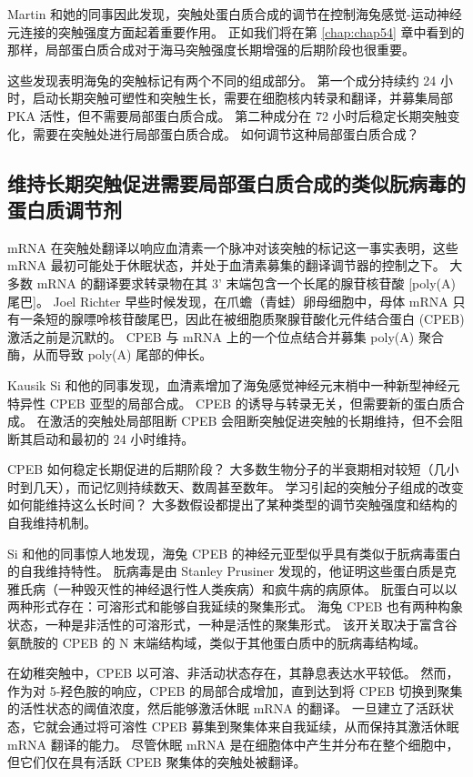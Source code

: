 Martin 和她的同事因此发现，突触处蛋白质合成的调节在控制海兔感觉-运动神经元连接的突触强度方面起着重要作用。
正如我们将在第 \ref{chap:chap54} 章中看到的那样，局部蛋白质合成对于海马突触强度长期增强的后期阶段也很重要。


这些发现表明海兔的突触标记有两个不同的组成部分。
第一个成分持续约 24 小时，启动长期突触可塑性和突触生长，需要在细胞核内转录和翻译，并募集局部 PKA 活性，但不需要局部蛋白质合成。
第二种成分在 72 小时后稳定长期突触变化，需要在突触处进行局部蛋白质合成。
如何调节这种局部蛋白质合成？



\subsection{维持长期突触促进需要局部蛋白质合成的类似朊病毒的蛋白质调节剂}

mRNA 在突触处翻译以响应血清素一个脉冲对该突触的标记这一事实表明，这些 mRNA 最初可能处于休眠状态，并处于血清素募集的翻译调节器的控制之下。
大多数 mRNA 的翻译要求转录物在其 3' 末端包含一个长尾的腺苷核苷酸 [poly(A) 尾巴]。
Joel Richter 早些时候发现，在爪蟾（青蛙）卵母细胞中，母体 mRNA 只有一条短的腺嘌呤核苷酸尾巴，因此在被细胞质聚腺苷酸化元件结合蛋白 (CPEB) 激活之前是沉默的。
CPEB 与 mRNA 上的一个位点结合并募集 poly(A) 聚合酶，从而导致 poly(A) 尾部的伸长。


Kausik Si 和他的同事发现，血清素增加了海兔感觉神经元末梢中一种新型神经元特异性 CPEB 亚型的局部合成。
CPEB 的诱导与转录无关，但需要新的蛋白质合成。
在激活的突触处局部阻断 CPEB 会阻断突触促进突触的长期维持，但不会阻断其启动和最初的 24 小时维持。


CPEB 如何稳定长期促进的后期阶段？
大多数生物分子的半衰期相对较短（几小时到几天），而记忆则持续数天、数周甚至数年。
学习引起的突触分子组成的改变如何能维持这么长时间？
大多数假设都提出了某种类型的调节突触强度和结构的自我维持机制。


Si 和他的同事惊人地发现，海兔 CPEB 的神经元亚型似乎具有类似于朊病毒蛋白的自我维持特性。
朊病毒是由 Stanley Prusiner 发现的，他证明这些蛋白质是克雅氏病（一种毁灭性的神经退行性人类疾病）和疯牛病的病原体。
朊蛋白可以以两种形式存在：可溶形式和能够自我延续的聚集形式。
海兔 CPEB 也有两种构象状态，一种是非活性的可溶形式，一种是活性的聚集形式。
该开关取决于富含谷氨酰胺的 CPEB 的 N 末端结构域，类似于其他蛋白质中的朊病毒结构域。


在幼稚突触中，CPEB 以可溶、非活动状态存在，其静息表达水平较低。
然而，作为对 5-羟色胺的响应，CPEB 的局部合成增加，直到达到将 CPEB 切换到聚集的活性状态的阈值浓度，然后能够激活休眠 mRNA 的翻译。
一旦建立了活跃状态，它就会通过将可溶性 CPEB 募集到聚集体来自我延续，从而保持其激活休眠 mRNA 翻译的能力。
尽管休眠 mRNA 是在细胞体中产生并分布在整个细胞中，但它们仅在具有活跃 CPEB 聚集体的突触处被翻译。


